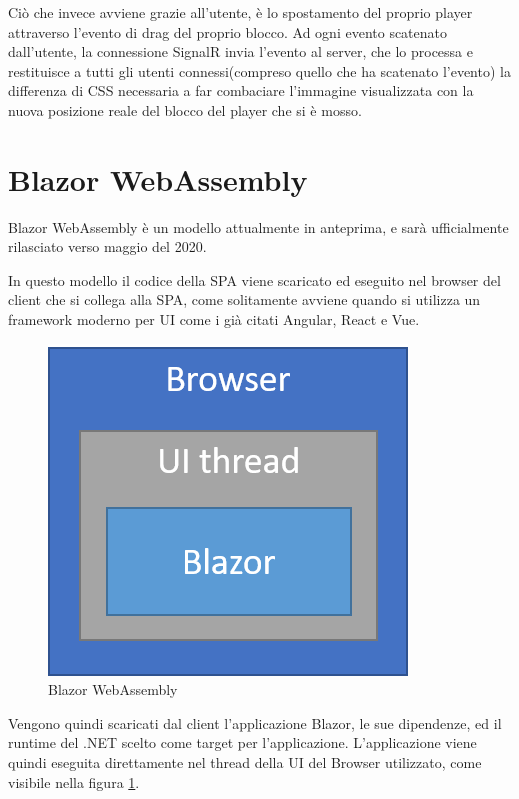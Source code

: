 Ci\`o che invece avviene grazie all'utente, \`e lo spostamento del proprio player attraverso l'evento di drag del proprio blocco.
Ad ogni evento scatenato dall'utente, la connessione SignalR invia l'evento al server, che lo processa e restituisce a tutti gli utenti connessi(compreso quello che ha scatenato l'evento) la differenza di CSS necessaria a far combaciare l'immagine visualizzata con la nuova posizione reale del blocco del player che si \`e mosso.

\pagebreak

\section{Blazor WebAssembly}\label{sez:bwa}
Blazor WebAssembly \`e un modello attualmente in anteprima, e sar\`a ufficialmente rilasciato verso maggio del 2020.

In questo modello il codice della SPA viene scaricato ed eseguito nel browser del client che si collega alla SPA, come solitamente avviene quando si utilizza un framework moderno per UI come i gi\`a citati Angular, React e Vue.

\begin{figure}[H]
	\centerline{\includegraphics[scale=0.6]{figure/blazor-WebAssembly.png}}
	\caption{Blazor WebAssembly}
	\label{fig:BlazorWebAssembly}
\end{figure}

Vengono quindi scaricati dal client l'applicazione Blazor, le sue dipendenze, ed il runtime del .NET scelto come target per l'applicazione.
L'applicazione viene quindi eseguita direttamente nel thread della UI del Browser utilizzato, come visibile nella figura \ref{fig:BlazorWebAssembly}.

